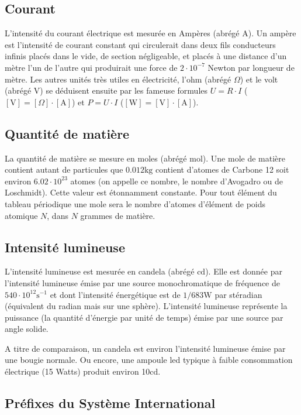 \documentclass[a4paper,12pt]{book}
\newcommand{\cd}{\mathrm{cd}}
\newcommand{\mol}{\mathrm{mol}}
\newcommand{\s}{\mathrm{s}}
\newcommand{\kg}{\mathrm{kg}}
\newcommand{\A}{\mathrm{A}}
\newcommand{\V}{\mathrm{V}}
\newcommand{\W}{\mathrm{W}}
\begin{document}
\subsection{Courant}

L'intensité du courant électrique est mesurée en Ampères (abrégé $\A$). Un ampère est l'intensité de courant constant qui circulerait 
dans deux fils conducteurs infinis placés dans le vide, de section négligeable, et placés à une distance d'un mètre l'un de l'autre 
qui produirait une force de $2\cdot 10^{-7}$ Newton par longueur de mètre. Les autres unités très utiles en électricité, l'ohm (abrégé $\Omega$) et 
le volt (abrégé $\V$) se déduisent ensuite par les fameuse formules $U=R\cdot I$ ($[\V]=[\Omega]\cdot [\A]$) et $P=U\cdot I$ ($[\W]=[\V]\cdot [\A]$).

\subsection{Quantité de matière}

La quantité de matière se mesure en moles (abrégé $\mol$). Une mole de matière contient autant de particules que 
$0.012\kg$ contient d'atomes de Carbone 12 soit environ $6.02\cdot 10^{23}$ atomes (on appelle ce nombre, le nombre d'Avogadro ou de Loschmidt). 
Cette valeur est étonnamment constante. Pour
tout élément du tableau périodique une mole sera le nombre d'atomes d'élément de poids atomique $N$, dans $N$ grammes de matière.

\subsection{Intensité lumineuse}

L'intensité lumineuse est mesurée en candela (abrégé $\cd$). Elle est donnée par l'intensité lumineuse émise par
une source monochromatique de fréquence de $540\cdot 10^{12}\s^{-1}$ et dont l'intensité énergétique est de 
$1/683 \W$ par stéradian (équivalent du radian mais sur une sphère). L'intensité lumineuse représente la puissance (la quantité d'énergie 
par unité de temps) émise par une source par angle solide. 

A titre de comparaison, un candela est environ l'intensité 
lumineuse émise par une bougie normale. Ou encore, une ampoule led typique 
à faible consommation électrique (15 Watts) produit environ 10$\cd$.

\subsection{Préfixes du Système International}
\end{document}
